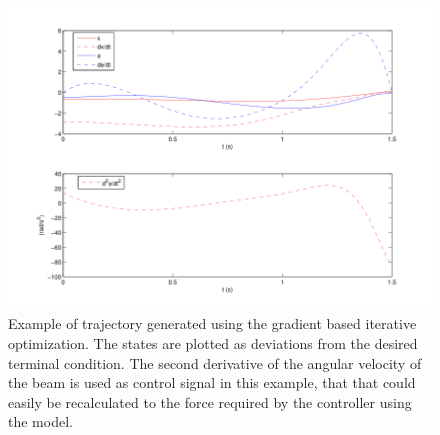 \begin{figure}[\textwidth]
\centering
\includegraphics[width=\textwidth]{ballbeammatlab}
\caption{Example of trajectory generated using the gradient based iterative optimization. The states are plotted as deviations from the desired terminal condition. The second derivative of the angular velocity of the beam is used as control signal in this example, that that could easily be recalculated to the force required by the controller using the model.}
\label{fig:matlabtrajectory}
\end{figure}